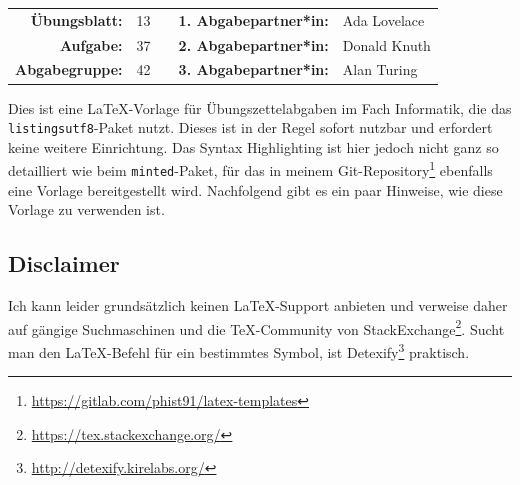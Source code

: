 
\newcommand{\obenlinks}{Übungen zur Vorlesung Informatik I}   %



\begin{center} %
  \begin{tabular}{|rlp{4cm}rl|}
  \hline
   \textbf{Übungsblatt:} & 13 &  & \textbf{1. Abgabepartner*in:} & Ada Lovelace \\
       \textbf{Aufgabe:} & 37 &  & \textbf{2. Abgabepartner*in:} & Donald Knuth \\
  \textbf{Abgabegruppe:} & 42 &  & \textbf{3. Abgabepartner*in:} & Alan Turing  \\ \hline
\end{tabular}
\end{center} 

Dies ist eine \LaTeX-Vorlage für Übungszettelabgaben im Fach Informatik, die das \texttt{listingsutf8}-Paket nutzt.
Dieses ist in der Regel sofort nutzbar und erfordert keine weitere Einrichtung.
Das Syntax Highlighting ist hier jedoch nicht ganz so detailliert wie beim \texttt{minted}-Paket, für das in meinem Git-Repository\footnote{\url{https://gitlab.com/phist91/latex-templates}} ebenfalls eine Vorlage bereitgestellt wird.
Nachfolgend gibt es ein paar Hinweise, wie diese Vorlage zu verwenden ist.

\subsection*{Disclaimer}
Ich kann leider grundsätzlich keinen \LaTeX-Support anbieten und verweise daher auf gängige Suchmaschinen und die \TeX-Community von StackExchange\footnote{\url{https://tex.stackexchange.org/}}.
Sucht man den LaTeX-Befehl für ein bestimmtes Symbol, ist Detexify\footnote{\url{http://detexify.kirelabs.org/}} praktisch.

